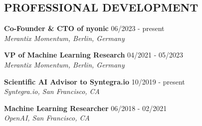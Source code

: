 \documentclass[10pt,centered]{./res} %
\begin{document}
\vspace*{-1.5cm}
\begin{resume}
\vspace{0.4cm}


\section{\color{ResumeBlue}PROFESSIONAL DEVELOPMENT}
{\bf Co-Founder \& CTO of nyonic } \hfill06/2023 - present \\
{\it Merantix Momentum, Berlin, Germany}

{\bf VP of Machine Learning Research} \hfill04/2021 - 05/2023 \\
{\it Merantix Momentum, Berlin, Germany}

{\bf Scientific AI Advisor to Syntegra.io } \hfill10/2019 - present \\
{\it Syntegra.io, San Francisco, CA}

{\bf Machine Learning Researcher} \hfill06/2018 - 02/2021 \\
{\it OpenAI, San Francisco, CA}


\end{resume}
\end{document}
